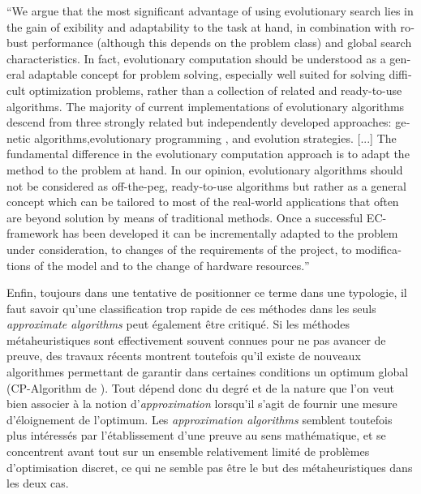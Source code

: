 \foreignquote{english}{We argue that the most significant advantage of using evolutionary search lies in the gain of exibility and adaptability to the task at hand, in combination with robust performance (although this depends on the problem class) and global search characteristics. In fact, evolutionary computation should be understood as a general adaptable concept for problem solving, especially well suited for solving difficult optimization problems, rather than a collection of related and ready-to-use algorithms. The majority of current implementations of evolutionary algorithms descend from three strongly related but independently developed approaches: genetic algorithms,evolutionary programming , and evolution strategies. [...] The fundamental difference in the evolutionary computation approach is to adapt the method to the problem at hand. In our opinion, evolutionary algorithms should not be considered as off-the-peg, ready-to-use algorithms but rather as a general concept which can be tailored to most of the real-world applications that often are beyond solution by means of traditional methods. Once a successful EC-framework has been developed it can be incrementally adapted to the problem under consideration, to changes of the requirements of the project, to modifications of the model and to the change of hardware resources.} \autocite{Back1997a}

Enfin, toujours dans une tentative de positionner ce terme dans une typologie, il faut savoir qu'une classification trop rapide de ces méthodes dans les seuls \textit{approximate algorithms} peut également être critiqué. Si les méthodes métaheuristiques sont effectivement souvent connues pour ne pas avancer de preuve, des travaux récents montrent toutefois qu'il existe de nouveaux algorithmes permettant de garantir dans certaines conditions un optimum global (CP-Algorithm de \autocite{Reuillon2015}). Tout dépend donc du degré et de la nature que l'on veut bien associer à la notion d'\textit{approximation} lorsqu'il s'agit de fournir une mesure d'éloignement de l'optimum. Les \textit{approximation algorithms} semblent toutefois plus intéressés par l'établissement d'une preuve au sens mathématique, et se concentrent avant tout sur un ensemble relativement limité de problèmes d'optimisation discret, ce qui ne semble pas être le but des métaheuristiques dans les deux cas. \autocites[1-6]{Kann1992}[13-15]{Williamson2011} %


